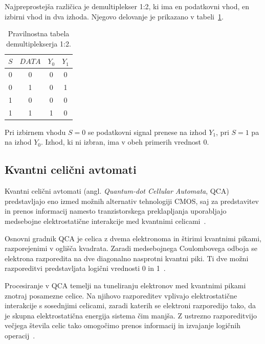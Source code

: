 Najpreprostejša različica je demultiplekser 1:2, ki ima en podatkovni vhod, en izbirni vhod in dva izhoda. Njegovo delovanje je prikazano v tabeli~\ref{g21:tab:demux}.

\begin{table}[htbp]
    \centering
    \caption{Pravilnostna tabela demultiplekserja 1:2.}
    \label{g21:tab:demux}
    \begin{tabular*}{0.25\linewidth}{@{\extracolsep{\fill}}cccc}
        \toprule
        $S$ & $DATA$ & $Y_0$ & $Y_1$ \\
        \midrule
        0 & 0 & 0 & 0 \\
        0 & 1 & 0 & 1 \\
        1 & 0 & 0 & 0 \\
        1 & 1 & 1 & 0 \\
        \bottomrule
    \end{tabular*}
\end{table}

Pri izbirnem vhodu $S=0$ se podatkovni signal prenese na izhod $Y_1$, pri $S=1$ pa na izhod $Y_0$. Izhod, ki ni izbran, ima v obeh primerih vrednost 0.


\subsection{Kvantni celični avtomati}
\label{g21:sec:qca}

Kvantni celični avtomati (angl. \emph{Quantum-dot Cellular Automata}, QCA) predstavljajo eno izmed možnih alternativ tehnologiji CMOS, saj za predstavitev in prenos informacij namesto tranzistorskega preklapljanja uporabljajo medsebojne elektrostatične interakcije med kvantnimi celicami~\cite{g21:janez2012}.

Osnovni gradnik QCA je celica z dvema elektronoma in štirimi kvantnimi pikami, razporejenimi v oglišča kvadrata. Zaradi medsebojnega Coulombovega odboja se elektrona razporedita na dve diagonalno nasprotni kvantni piki. Ti dve možni razporeditvi predstavljata logični vrednosti 0 in 1~\cite{g21:janez2012}.

Procesiranje v QCA temelji na tuneliranju elektronov med kvantnimi pikami znotraj posamezne celice. Na njihovo razporeditev vplivajo elektrostatične interakcije s sosednjimi celicami, zaradi katerih se elektroni razporedijo tako, da je skupna elektrostatična energija sistema čim manjša. Z ustrezno razporeditvijo večjega števila celic tako omogočimo prenos informacij in izvajanje logičnih operacij~\cite{g21:janez2012}.

